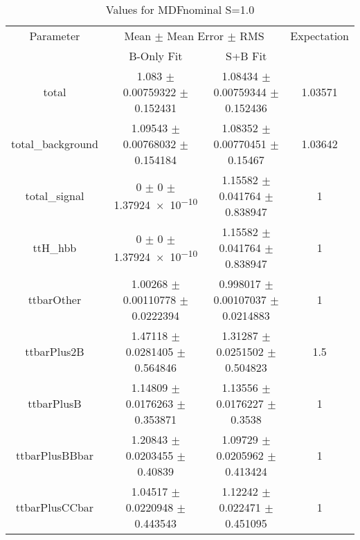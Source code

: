 \begin{table}
\centering
\caption{Values for MDFnominal S=1.0}
\begin{tabular}{cccc}
\toprule
Parameter & \multicolumn{2}{c}{Mean $\pm$ Mean Error $\pm$ RMS} & Expectation\\
 & B-Only Fit & S+B Fit & \\
\midrule
total & \num{1.083} $\pm$ \num{0.00759322} $\pm$ \num{0.152431} & \num{1.08434} $\pm$ \num{0.00759344} $\pm$ \num{0.152436} & \num{1.03571}\\
total\_background & \num{1.09543} $\pm$ \num{0.00768032} $\pm$ \num{0.154184} & \num{1.08352} $\pm$ \num{0.00770451} $\pm$ \num{0.15467} & \num{1.03642}\\
total\_signal & \num{0} $\pm$ \num{0} $\pm$ \num{1.37924e-10} & \num{1.15582} $\pm$ \num{0.041764} $\pm$ \num{0.838947} & \num{1}\\
ttH\_hbb & \num{0} $\pm$ \num{0} $\pm$ \num{1.37924e-10} & \num{1.15582} $\pm$ \num{0.041764} $\pm$ \num{0.838947} & \num{1}\\
ttbarOther & \num{1.00268} $\pm$ \num{0.00110778} $\pm$ \num{0.0222394} & \num{0.998017} $\pm$ \num{0.00107037} $\pm$ \num{0.0214883} & \num{1}\\
ttbarPlus2B & \num{1.47118} $\pm$ \num{0.0281405} $\pm$ \num{0.564846} & \num{1.31287} $\pm$ \num{0.0251502} $\pm$ \num{0.504823} & \num{1.5}\\
ttbarPlusB & \num{1.14809} $\pm$ \num{0.0176263} $\pm$ \num{0.353871} & \num{1.13556} $\pm$ \num{0.0176227} $\pm$ \num{0.3538} & \num{1}\\
ttbarPlusBBbar & \num{1.20843} $\pm$ \num{0.0203455} $\pm$ \num{0.40839} & \num{1.09729} $\pm$ \num{0.0205962} $\pm$ \num{0.413424} & \num{1}\\
ttbarPlusCCbar & \num{1.04517} $\pm$ \num{0.0220948} $\pm$ \num{0.443543} & \num{1.12242} $\pm$ \num{0.022471} $\pm$ \num{0.451095} & \num{1}\\
\bottomrule
\end{tabular}
\end{table}